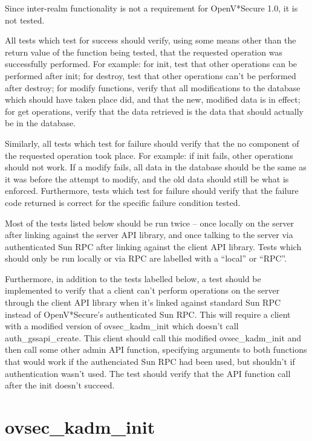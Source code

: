 Since inter-realm functionality is not a requirement for OpenV*Secure
1.0, it is not tested.

All tests which test for success should verify, using some means other
than the return value of the function being tested, that the requested
operation was successfully performed.  For example: for init, test
that other operations can be performed after init; for destroy, test
that other operations can't be performed after destroy; for modify
functions, verify that all modifications to the database which should
have taken place did, and that the new, modified data is in effect;
for get operations, verify that the data retrieved is the data that
should actually be in the database.

Similarly, all tests which test for failure should verify that the
no component of the requested operation took place.  For example: if
init fails, other operations should not work.  If a modify fails, all
data in the database should be the same as it was before the attempt
to modify, and the old data should still be what is enforced.
Furthermore, tests which test for failure should verify that the
failure code returned is correct for the specific failure condition
tested.

Most of the tests listed below should be run twice -- once locally on
the server after linking against the server API library, and once
talking to the server via authenticated Sun RPC after linking against
the client API library.  Tests which should only be run locally or via
RPC are labelled with a ``local'' or ``RPC''.

Furthermore, in addition to the tests labelled below, a test should be
implemented to verify that a client can't perform operations on the
server through the client API library when it's linked against
standard Sun RPC instead of OpenV*Secure's authenticated Sun RPC.
This will require a client with a modified version of ovsec_kadm_init
which doesn't call auth_gssapi_create.  This client should call this
modified ovsec_kadm_init and then call some other admin API function,
specifying arguments to both functions that would work if the
authenciated Sun RPC had been used, but shouldn't if authentication
wasn't used.  The test should verify that the API function call after
the init doesn't succeed.

\section{ovsec_kadm_init}

